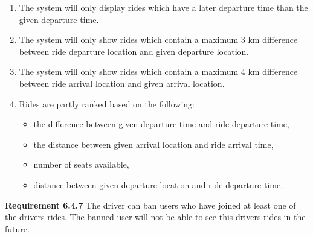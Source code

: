 \documentclass{article}
\begin{document}
\begin{enumerate}[label=(\alph*)]
    \item The system will only display rides which have a later departure time than the given departure time.
    \item The system will only show rides which contain a maximum 3 km difference between ride departure location and given departure location.
    \item The system will only show rides which contain a maximum 4 km difference between ride arrival location and given arrival location.
    \item Rides are partly ranked based on the following:
        \begin{itemize}
            \item the difference between given departure time and ride departure time,
            \item the distance between given arrival location and ride arrival time,
            \item number of seats available, 
            \item distance between given departure location and ride departure time.
        \end{itemize}
\end{enumerate}
\textbf{Requirement 6.4.7} The driver can ban users who have joined at least one of the drivers rides. The banned user will not be able to see this drivers rides in the future.
\\ \\
\end{document}
